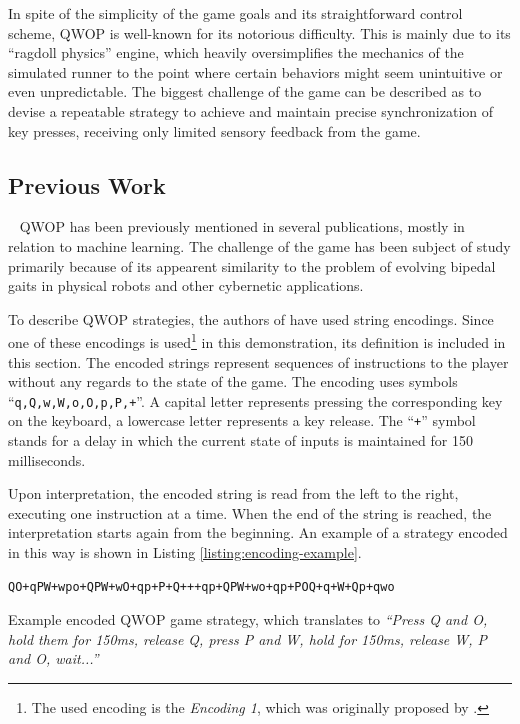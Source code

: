 In spite of the simplicity of the game goals and its straightforward control scheme, QWOP is well-known for its notorious difficulty. This is mainly due to its ``ragdoll physics'' engine, which heavily oversimplifies the mechanics of the simulated runner to the point where certain behaviors might seem unintuitive or even unpredictable. \cite{QwopHomework} The biggest challenge of the game can be described as to devise a repeatable strategy to achieve and maintain precise synchronization of key presses, receiving only limited sensory feedback from the game.

\subsection{Previous Work}~\label{section:qwop-previous-work}
QWOP has been previously mentioned in several publications, mostly in relation to machine learning. The challenge of the game has been subject of study primarily because of its appearent similarity to the problem of evolving bipedal gaits in physical robots and other cybernetic applications.

To describe QWOP strategies, the authors of \cite{EvolvingQwopGaits} have used string encodings. Since one of these encodings is used\footnote{The used encoding is the \textit{Encoding 1}, which was originally proposed by \cite{QwopEncoding}.} in this demonstration, its definition is included in this section. The encoded strings represent sequences of instructions to the player without any regards to the state of the game. The encoding uses symbols ``\texttt{q,Q,w,W,o,O,p,P,+}''. A capital letter represents pressing the corresponding key on the keyboard, a lowercase letter represents a key release. The ``\texttt{+}'' symbol stands for a delay in which the current state of inputs is maintained for 150 milliseconds. \cite{EvolvingQwopGaits}

Upon interpretation, the encoded string is read from the left to the right, executing one instruction at a time. When the end of the string is reached, the interpretation starts again from the beginning. An example of a strategy encoded in this way is shown in Listing \ref{listing:encoding-example}.

\begin{listing}[ht]
	\begin{verbatim}
QO+qPW+wpo+QPW+wO+qp+P+Q+++qp+QPW+wo+qp+POQ+q+W+Qp+qwo
	\end{verbatim}
	\caption[Example encoded QWOP game strategy.]{Example encoded QWOP game strategy, which translates to \textit{``Press Q and O, hold them for 150ms, release Q, press P and W, hold for 150ms, release W, P and O, wait...''} \cite{EvolvingQwopGaits}}
	\label{listing:encoding-example}
\end{listing}

